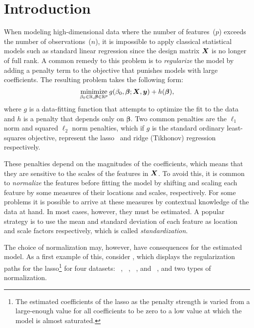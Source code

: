 \section{Introduction}

When modeling high-dimensional data where the number of features~(\(p\)) exceeds the number
of observations~(\(n\)), it is impossible to apply classical statistical models such as
standard linear regression since the design matrix \(\bm X\) is no longer of full rank. A
common remedy to this problem is to \emph{regularize} the model by adding a penalty term to
the objective that punishes models with large coefficients. The resulting problem takes the
following form:
\begin{equation}
  \label{eq:general-objective}
  \operatorname*{minimize}_{\beta_0 \in \mathbb{R},\bm{\beta} \in \mathbb{R}^p} g(\beta_0, \bm{\beta}; \bm X, \bm y) + h(\bm\beta),
\end{equation}
%
where \(g\) is a data-fitting function that attempts to optimize the fit to the data and
\(h\) is a penalty that depends only on \(\bm{\beta}\). Two common penalties are the
\(\ell_1\) norm and squared \(\ell_2\) norm penalties, which if \(g\) is the standard
ordinary least-squares objective, represent the
lasso~\citep{tibshirani1996,santosa1986,donoho1994} and ridge (Tikhonov) regression
respectively.

These penalties depend on the magnitudes of the coefficients, which means that they are
sensitive to the scales of the features in \(\bm X\). To avoid this, it is common to
\emph{normalize} the features before fitting the model by shifting and scaling each feature
by some measures of their locations and scales, respectively. For some problems it is
possible to arrive at these measures by contextual knowledge of the data at hand. In most
cases, however, they must be estimated. A popular strategy is to use the mean and standard
deviation of each feature as location and scale factors respectively, which is called
\emph{standardization}.

The choice of normalization may, however, have consequences for the estimated model. As a
first example of this, consider , which displays the
regularization paths for the lasso\footnote{The estimated coefficients of the lasso as the
  penalty strength is varied from a large-enough value for all coefficients to be zero to a
  low value at which the model is almost saturated.} for four datasets:
~\citep{harrison1978}, ~\citep{becker1996,platt1998},
~\citep{king1995,hirst1994}, and ~\citep{platt1998}, and two
types of normalization.

